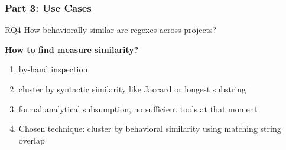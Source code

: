 \begin{frame}
\frametitle{Part 3: Use Cases}

\begin{block}{RQ4}
How behaviorally similar are regexes across projects?
\end{block}
%
\textbf{How to find measure similarity?}

\begin{enumerate}
\item<3-> \sout{by-hand inspection}
\item<4-> \sout{cluster by syntactic similarity like Jaccard or longest substring}
\item<5-> \sout{formal analytical subsumption, no sufficient tools at that moment}
\item<6-> \begin{Large}Chosen technique: cluster by behavioral similarity using matching string overlap \end{Large}
\end{enumerate}
\end{frame}



